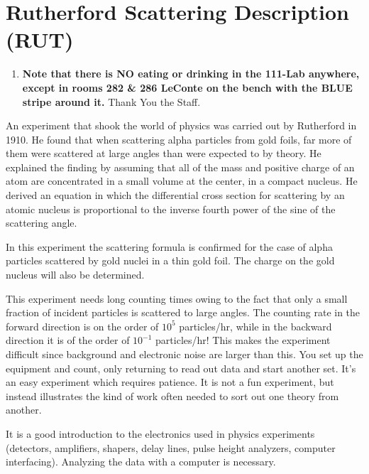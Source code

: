 \documentclass{../lab}
\begin{document}
\maketitle

\tableofcontents

\section{Rutherford Scattering Description (RUT)}

\begin{enumerate}
    \item \textbf{Note that there is NO eating or drinking in the 111-Lab anywhere, except in rooms 282 \& 286 LeConte on the bench with the BLUE stripe around it.} Thank You the Staff.

\end{enumerate}

An experiment that shook the world of physics was carried out by Rutherford in 1910. He found that when scattering alpha particles from gold foils, far more of them were scattered at large angles than were expected to by theory. He explained the finding by assuming that all of the mass and positive charge of an atom are concentrated in a small volume at the center, in a compact nucleus. He derived an equation in which the differential cross section for scattering by an atomic nucleus is proportional to the inverse fourth power of the sine of the scattering angle.

In this experiment the scattering formula is confirmed for the case of alpha particles scattered by gold nuclei in a thin gold foil. The charge on the gold nucleus will also be determined.

This experiment needs long counting times owing to the fact that only a small fraction of incident particles is scattered to large angles. The counting rate in the forward direction is on the order of $10^5$ particles/hr, while in the backward direction it is of the order of $10^{-1}$ particles/hr! This makes the experiment difficult since background and electronic noise are larger than this. You set up the equipment and count, only returning to read out data and start another set. It's an easy experiment which requires patience. It is not a fun experiment, but instead illustrates the kind of work often needed to sort out one theory from another.

It is a good introduction to the electronics used in physics experiments (detectors, amplifiers, shapers, delay lines, pulse height analyzers, computer interfacing). Analyzing the data with a computer is necessary.
\end{document}
